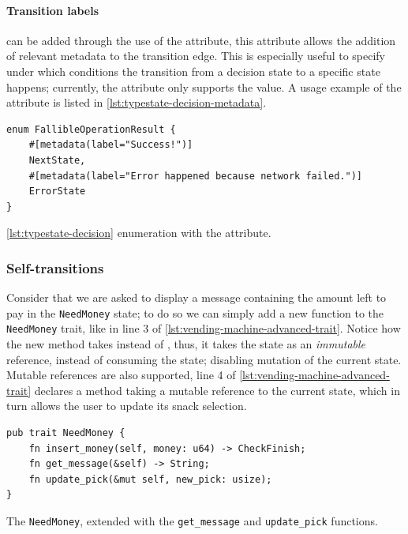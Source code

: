 \paragraph{Transition labels} can be added through the use of the \textcolor{attrgreen}{} attribute,
this attribute allows the addition of relevant metadata to the transition edge.
This is especially useful to specify under which conditions the transition from a decision state to a specific state happens;
currently, the attribute only supports the  value.
A usage example of the  attribute is listed in \autoref{lst:typestate-decision-metadata}.

\begin{listing}
    \begin{verbatim}
enum FallibleOperationResult {
    #[metadata(label="Success!")]
    NextState,
    #[metadata(label="Error happened because network failed.")]
    ErrorState
}
    \end{verbatim}
    \caption{\autoref{lst:typestate-decision} enumeration with the \textcolor{attrgreen}{} attribute.}
    \label{lst:typestate-decision-metadata}
\end{listing}

\subsubsection{Self-transitions}
Consider that we are asked to display a message containing the amount left to pay in the \textcolor{structblue}{\texttt{NeedMoney}} state;
to do so we can simply add a new function to the \textcolor{structblue}{\texttt{NeedMoney}} trait, like in line 3 of \autoref{lst:vending-machine-advanced-trait}.
Notice how the new method takes  instead of , thus,
it takes the state as an \emph{immutable} reference, instead of consuming the state;
disabling mutation of the current state.
Mutable references are also supported,
line 4 of \autoref{lst:vending-machine-advanced-trait} declares a method taking a mutable reference to the current state,
which in turn allows the user to update its snack selection.

\begin{listing}
    \begin{verbatim}
pub trait NeedMoney {
    fn insert_money(self, money: u64) -> CheckFinish;
    fn get_message(&self) -> String;
    fn update_pick(&mut self, new_pick: usize);
}
    \end{verbatim}
    \caption{The \textcolor{structblue}{\texttt{NeedMoney}}, extended with the \texttt{get\_message} and \texttt{update\_pick} functions.}
    \label{lst:vending-machine-advanced-trait}
\end{listing}

